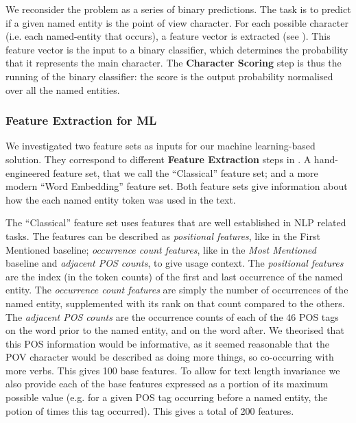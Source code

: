 \documentclass[11pt,a4paper]{article}
\begin{document}
We reconsider the problem as a series of binary predictions.
The task is to predict if a given named entity is the point of view character.
For each possible character (i.e. each named-entity that occurs), a feature vector is extracted (see ).
This feature vector is the input to a binary classifier, which determines the probability that it represents the main character.
The \textbf{Character Scoring} step is thus the running of the binary classifier:
the score is the output probability normalised over all the named entities.



\subsubsection{Feature Extraction for ML}\label{sec:feature-extraction-for-ml}
We investigated two feature sets as inputs for our machine learning-based solution.
They correspond to different \textbf{Feature Extraction} steps in .
A hand-engineered feature set, that we call the ``Classical'' feature set;
and a more modern ``Word Embedding'' feature set.
Both feature sets give information about how the each named entity token was used in the text.


The  ``Classical'' feature set uses features that are well established in NLP related tasks.
The features can be described as \emph{positional features}, like in the First Mentioned baseline; \emph{occurrence count features}, like in the \emph{Most Mentioned} baseline
and \emph{adjacent POS counts}, to give usage context.
The \emph{positional features} are the index (in the token counts) of the first and last occurrence of the named entity.
The \emph{occurrence count features} are simply the number of occurrences of the named entity, supplemented with its rank on that count compared to the others.
The \emph{adjacent POS counts} are the occurrence counts of each of the 46 POS tags on the word prior to the named entity, and on the word after.
We theorised that this POS information would be informative, as it seemed reasonable that the POV character would be described as doing more things, so co-occurring with more verbs.
This gives 100 base features.
To allow for text length invariance we also provide each of the base features expressed as a portion of its maximum possible value (e.g. for a given POS tag occurring before a named entity, the potion of times this tag occurred).
This gives a total of 200 features.
\end{document}
